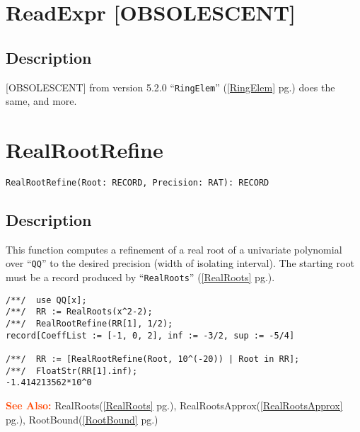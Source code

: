 \documentclass[a4paper]{mybook}
\newenvironment{command}{}{} %
\newcommand\SeeAlso{\par\textcolor{OrangeRed}{\textbf{\large See Also: }}}
\begin{document}
\section{ReadExpr [OBSOLESCENT]}
\label{ReadExpr [OBSOLESCENT]}
\begin{command} %



\subsection*{Description}

[OBSOLESCENT]
from version 5.2.0 ``\verb&RingElem&'' (\ref{RingElem} pg.\pageref{RingElem}) does the same, and more.

\end{command} %

\section{RealRootRefine}
\label{RealRootRefine}
\begin{command} %


\begin{Verbatim}[label=syntax, rulecolor=\color{MidnightBlue},
frame=single]
RealRootRefine(Root: RECORD, Precision: RAT): RECORD
\end{Verbatim}


\subsection*{Description}

This function computes a refinement of a real root of a univariate
polynomial over ``\verb&QQ&'' to the desired precision (width of isolating
interval).  The starting root must be a record produced by ``\verb&RealRoots&'' (\ref{RealRoots} pg.\pageref{RealRoots}).
\begin{Verbatim}[label=example, rulecolor=\color{PineGreen}, frame=single]
/**/  use QQ[x];
/**/  RR := RealRoots(x^2-2);
/**/  RealRootRefine(RR[1], 1/2);
record[CoeffList := [-1, 0, 2], inf := -3/2, sup := -5/4]

/**/  RR := [RealRootRefine(Root, 10^(-20)) | Root in RR];
/**/  FloatStr(RR[1].inf);
-1.414213562*10^0
\end{Verbatim}


\SeeAlso %
  RealRoots(\ref{RealRoots} pg.\pageref{RealRoots}), 
    RealRootsApprox(\ref{RealRootsApprox} pg.\pageref{RealRootsApprox}), 
    RootBound(\ref{RootBound} pg.\pageref{RootBound})
\end{command} %
\end{document}
